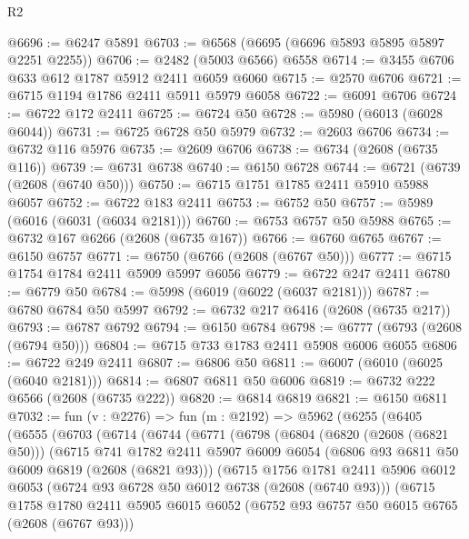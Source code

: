 \begin{lexlean}{R2}
\begin{coremodule}
@6696 := @6247 @5891
@6703 := @6568 (@6695 (@6696 @5893 @5895 @5897 @2251 @2255))
@6706 := @2482 (@5003 @6566) @6558
@6714 := @3455 @6706 @633 @612 @1787 @5912 @2411 @6059 @6060
@6715 := @2570 @6706
@6721 := @6715 @1194 @1786 @2411 @5911 @5979 @6058
@6722 := @6091 @6706
@6724 := @6722 @172 @2411
@6725 := @6724 @50
@6728 := @5980 (@6013 (@6028 @6044))
@6731 := @6725 @6728 @50 @5979
@6732 := @2603 @6706
@6734 := @6732 @116 @5976
@6735 := @2609 @6706
@6738 := @6734 (@2608 (@6735 @116))
@6739 := @6731 @6738
@6740 := @6150 @6728
@6744 := @6721 (@6739 (@2608 (@6740 @50)))
@6750 := @6715 @1751 @1785 @2411 @5910 @5988 @6057
@6752 := @6722 @183 @2411
@6753 := @6752 @50
@6757 := @5989 (@6016 (@6031 (@6034 @2181)))
@6760 := @6753 @6757 @50 @5988
@6765 := @6732 @167 @6266 (@2608 (@6735 @167))
@6766 := @6760 @6765
@6767 := @6150 @6757
@6771 := @6750 (@6766 (@2608 (@6767 @50)))
@6777 := @6715 @1754 @1784 @2411 @5909 @5997 @6056
@6779 := @6722 @247 @2411
@6780 := @6779 @50
@6784 := @5998 (@6019 (@6022 (@6037 @2181)))
@6787 := @6780 @6784 @50 @5997
@6792 := @6732 @217 @6416 (@2608 (@6735 @217))
@6793 := @6787 @6792
@6794 := @6150 @6784
@6798 := @6777 (@6793 (@2608 (@6794 @50)))
@6804 := @6715 @733 @1783 @2411 @5908 @6006 @6055
@6806 := @6722 @249 @2411
@6807 := @6806 @50
@6811 := @6007 (@6010 (@6025 (@6040 @2181)))
@6814 := @6807 @6811 @50 @6006
@6819 := @6732 @222 @6566 (@2608 (@6735 @222))
@6820 := @6814 @6819
@6821 := @6150 @6811
@7032 := fun (v : @2276) =>
  fun (m : @2192) =>
  @5962
    (@6255
      (@6405
        (@6555
          (@6703
            (@6714
              (@6744
                (@6771
                  (@6798
                    (@6804
                      (@6820 (@2608 (@6821 @50)))
                      (@6715
                        @741
                        @1782
                        @2411
                        @5907
                        @6009
                        @6054
                        (@6806 @93 @6811 @50 @6009 @6819 (@2608 (@6821 @93)))
                        (@6715
                          @1756
                          @1781
                          @2411
                          @5906
                          @6012
                          @6053
                          (@6724 @93 @6728 @50 @6012 @6738 (@2608 (@6740 @93)))
                          (@6715
                            @1758
                            @1780
                            @2411
                            @5905
                            @6015
                            @6052
                            (@6752 @93 @6757 @50 @6015 @6765 (@2608 (@6767 @93)))

\end{coremodule}
\end{lexlean}
